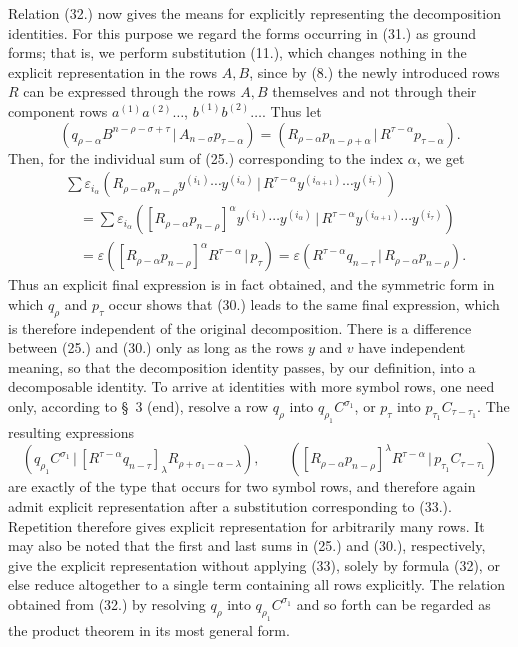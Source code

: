 \documentclass[11pt]{article}
\newcommand{\pair}[2]{(#1\,|\,#2)}
\newcommand{\eps}{\varepsilon}
\begin{document}
Relation (32.) now gives the means for explicitly representing the decomposition identities. For this purpose we regard the forms occurring in (31.) as ground forms; that is, we perform substitution (11.), which changes nothing in the explicit representation in the rows $A,B$, since by (8.) the newly introduced rows $R$ can be expressed through the rows $A,B$ themselves and not through their component rows $a^{(1)}a^{(2)}\ldots$, $b^{(1)}b^{(2)}\ldots$. Thus let
\begin{equation}
 \pair{q_{\rho-\alpha}B^{n-\rho-\sigma+\tau}}{A_{n-\sigma}p_{\tau-\alpha}}
 =\pair{R_{\rho-\alpha}p_{n-\rho+\alpha}}{R^{\tau-\alpha}p_{\tau-\alpha}}.
\tag{33}
\end{equation}
Then, for the individual sum of (25.) corresponding to the index $\alpha$, we get
\begin{equation}
\begin{aligned}
&\sum \eps_{i_\alpha}\pair{R_{\rho-\alpha}p_{n-\rho}y^{(i_1)}\cdots y^{(i_\alpha)}}{R^{\tau-\alpha}y^{(i_{\alpha+1})}\cdots y^{(i_\tau)}}\\
&\quad=\sum \eps_{i_\alpha}\pair{[R_{\rho-\alpha}p_{n-\rho}]^\alpha y^{(i_1)}\cdots y^{(i_\alpha)}}{R^{\tau-\alpha}y^{(i_{\alpha+1})}\cdots y^{(i_\tau)}}\\
&\quad=\eps\pair{[R_{\rho-\alpha}p_{n-\rho}]^\alpha R^{\tau-\alpha}}{p_\tau}
 =\eps\pair{R^{\tau-\alpha}q_{n-\tau}}{R_{\rho-\alpha}p_{n-\rho}}.
\end{aligned}
\tag{34}
\end{equation}
Thus an explicit final expression is in fact obtained, and the symmetric form in which $q_\rho$ and $p_\tau$ occur shows that (30.) leads to the same final expression, which is therefore independent of the original decomposition. There is a difference between (25.) and (30.) only as long as the rows $y$ and $v$ have independent meaning, so that the decomposition identity passes, by our definition, into a decomposable identity. To arrive at identities with more symbol rows, one need only, according to \S\ 3 (end), resolve a row $q_\rho$ into $q_{\rho_1}C^{\sigma_1}$, or $p_\tau$ into $p_{\tau_1}C_{\tau-\tau_1}$. The resulting expressions
\begin{equation}
 \pair{q_{\rho_1}C^{\sigma_1}}{[R^{\tau-\alpha}q_{n-\tau}]_\lambda R_{\rho+\sigma_1-\alpha-\lambda}},
 \qquad
 \pair{[R_{\rho-\alpha}p_{n-\rho}]^\lambda R^{\tau-\alpha}}{p_{\tau_1}C_{\tau-\tau_1}}
\tag{35}
\end{equation}
are exactly of the type that occurs for two symbol rows, and therefore again admit explicit representation after a substitution corresponding to (33.). Repetition therefore gives explicit representation for arbitrarily many rows. It may also be noted that the first and last sums in (25.) and (30.), respectively, give the explicit representation without applying (33), solely by formula (32), or else reduce altogether to a single term containing all rows explicitly. The relation obtained from (32.) by resolving $q_\rho$ into $q_{\rho_1}C^{\sigma_1}$ and so forth can be regarded as the product theorem in its most general form.
\end{document}
